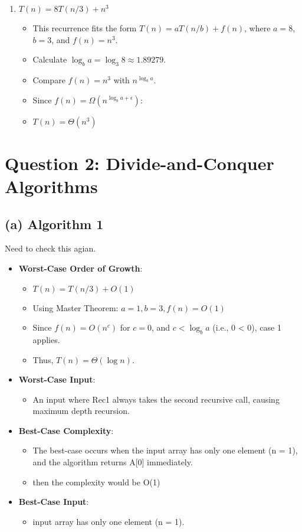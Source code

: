 \documentclass{article}
\begin{document}
\begin{enumerate}[label=(\alph*)]
    \item \( T(n) = 8T(n/3) + n^3 \)
    \begin{itemize}
        \item This recurrence fits the form \( T(n) = aT(n/b) + f(n) \), where \( a = 8 \), \( b = 3 \), and \( f(n) = n^3 \).
        \item Calculate \( \log_b{a} = \log_3{8} \approx 1.89279 \).
        \item Compare \( f(n) = n^3 \) with \( n^{\log_b{a}} \).
        \item Since \( f(n) = \Omega(n^{\log_b{a} + \epsilon}) \):
        \item \( T(n) = \Theta(n^3) \)
    \end{itemize}
\end{enumerate}

\section*{Question 2: Divide-and-Conquer Algorithms}

\subsection*{(a) Algorithm 1}
Need to check this agian. 
\begin{itemize}
    \item \textbf{Worst-Case Order of Growth}:
    \begin{itemize}
        \item \( T(n) = T(n/3) + O(1) \)
        \item Using Master Theorem: \( a = 1, b = 3, f(n) = O(1) \)
        \item Since \( f(n) = O(n^c) \) for \( c = 0 \), and \( c < \log_b{a} \) (i.e., 0 < 0), case 1 applies.
        \item Thus, \( T(n) = \Theta(\log n) \).
    \end{itemize}
    
    \item \textbf{Worst-Case Input}:
    \begin{itemize}
        \item An input where Rec1 always takes the second recursive call, causing maximum depth recursion.
    \end{itemize}

    \item \textbf{Best-Case Complexity}:
    \begin{itemize}
        \item The best-case occurs when the input array has only one element (n = 1), and the algorithm returns A[0] immediately.
        \item then the complexity would be  O(1)
    \end{itemize}

    \item \textbf{Best-Case Input}:
    \begin{itemize}
        \item  input array has only one element (n = 1). 
    \end{itemize}
\end{itemize}
\end{document}
